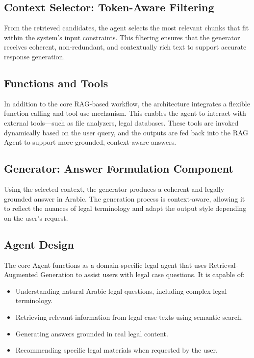 \subsection{Context Selector: Token-Aware Filtering}
From the retrieved candidates, the agent selects the most relevant chunks that fit within the system’s input constraints. This filtering ensures that the generator receives coherent, non-redundant, and contextually rich text to support accurate response generation.
\subsection{Functions and Tools}
In addition to the core RAG-based workflow, the architecture integrates a flexible function-calling and tool-use mechanism. This enables the agent to interact with external tools—such as file analyzers, legal databases. These tools are invoked dynamically based on the user query, and the outputs are fed back into the RAG Agent to support more grounded, context-aware answers.


\subsection{Generator: Answer Formulation Component}
Using the selected context, the generator produces a coherent and legally grounded answer in Arabic. The generation process is context-aware, allowing it to reflect the nuances of legal terminology and adapt the output style depending on the user’s request.

\subsection{Agent Design}
The core Agent functions as a domain-specific legal agent that uses Retrieval-Augmented Generation to assist users with legal case questions. It is capable of:

\begin{itemize}
	\item Understanding natural Arabic legal questions, including complex legal terminology.
	\item Retrieving relevant information from legal case texts using semantic search.
	\item Generating answers grounded in real legal content.
	\item Recommending specific legal materials when requested by the user.
\end{itemize}

